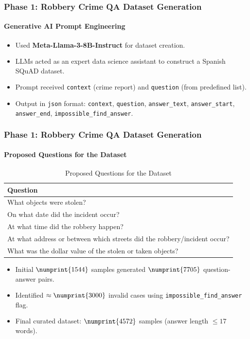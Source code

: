 \documentclass{beamer}
\begin{document}
\begin{frame}
    \frametitle{Phase 1: Robbery Crime \ac{QA} Dataset Generation}
    \framesubtitle{Generative \ac{AI} Prompt Engineering}
    \begin{itemize}
        \item Used \textbf{Meta-Llama-3-8B-Instruct} for dataset creation.
        \item \ac{LLMs} acted as an expert data science assistant to construct a Spanish \ac{SQuAD} dataset.
        \item Prompt received \texttt{context} (crime report) and \texttt{question} (from predefined list).
        \item Output in \texttt{json} format: \texttt{context}, \texttt{question}, \texttt{answer\_text}, \texttt{answer\_start}, \texttt{answer\_end}, \texttt{impossible\_find\_answer}.
    \end{itemize}
\end{frame}

\begin{frame}
    \frametitle{Phase 1: Robbery Crime \ac{QA} Dataset Generation}
    \framesubtitle{Proposed Questions for the Dataset}
    \begin{table}[h]
      \centering
      \small
    \caption{Proposed Questions for the Dataset}
    \label{tab:commonquestions-slide}
    \begin{tabular}{|p{}|}
    \hline
    \textbf{Question} \\
    \hline
    What objects were stolen? \\
    On what date did the incident occur? \\
    At what time did the robbery happen? \\
    At what address or between which streets did the robbery/incident occur? \\
    What was the dollar value of the stolen or taken objects? \\
    \hline
    \end{tabular}
    \end{table}
    \begin{itemize}
        \item Initial $\numprint{1544}$ samples generated $\numprint{7705}$ question-answer pairs.
        \item Identified $\approx \numprint{3000}$ invalid cases using \texttt{impossible\_find\_answer} flag.
        \item Final curated dataset: $\numprint{4572}$ samples (answer length $\leq 17$ words).
    \end{itemize}
\end{frame}
\end{document}
